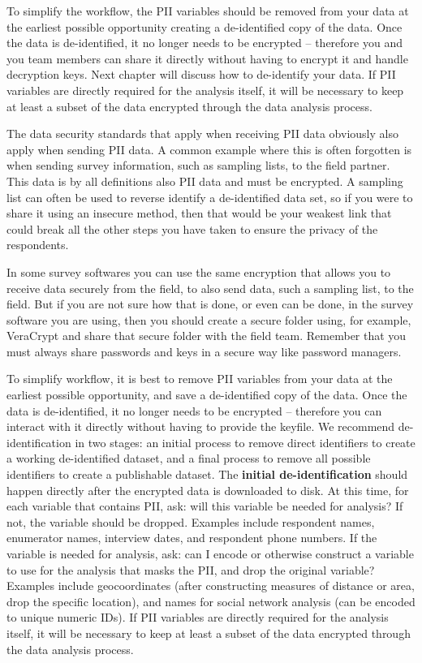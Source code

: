To simplify the workflow, the PII variables should be removed from your data at the earliest 
possible opportunity creating a de-identified copy of the data. Once the data is de-identified,
it no longer needs to be encrypted -- therefore you and you team members can share it directly 
without having to encrypt it and handle decryption keys. Next chapter will discuss how to 
de-identify your data. If PII variables are directly required for the analysis itself, it will 
be necessary to keep at least a subset of the data encrypted through the data analysis process.

The data security standards that apply when receiving PII data obviously also apply when sending 
PII data. A common example where this is often forgotten is when sending survey information, 
such as sampling lists, to the field partner. This data is by all definitions also PII data and 
must be encrypted. A sampling list can often be used to reverse identify a de-identified data set,
so if you were to share it using an insecure method, then that would be your weakest link that 
could break all the other steps you have taken to ensure the privacy of the respondents.

In some survey softwares you can use the same encryption that allows you to receive data securely 
from the field, to also send data, such a sampling list, to the field. But if you are not sure how 
that is done, or even can be done, in the survey software you are using, then you should create a 
secure folder using, for example, VeraCrypt and share that secure folder with the field team. 
Remember that you must always share passwords and keys in a secure way like password managers.

To simplify workflow, it is best to remove PII variables from your data
at the earliest possible opportunity, and save a de-identified copy of the data.
Once the data is de-identified, it no longer needs to be encrypted
-- therefore you can interact with it directly without having to provide the keyfile.
We recommend de-identification in two stages:
an initial process to remove direct identifiers to create a working de-identified dataset,
and a final process to remove all possible identifiers to create a publishable dataset.
The \textbf{initial de-identification} should happen directly after the encrypted data is downloaded to disk.
At this time, for each variable that contains PII, ask: will this variable be needed for analysis?
If not, the variable should be dropped.
Examples include respondent names, enumerator names, interview dates, and respondent phone numbers.
If the variable is needed for analysis, ask:
can I encode or otherwise construct a variable to use for the analysis that masks the PII,
and drop the original variable?
Examples include geocoordinates (after constructing measures of distance or area, drop the specific location), and names for social network analysis (can be encoded to unique numeric IDs).
If PII variables are directly required for the analysis itself,
it will be necessary to keep at least a subset of the data encrypted through the data analysis process.

